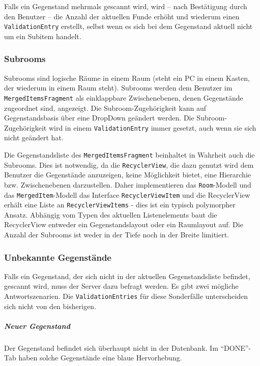 Falls ein Gegenstand mehrmals gescannt wird, wird -- nach Bestätigung
durch den Benutzer -- die Anzahl der aktuellen Funde erhöht und wiederum
einen \texttt{ValidationEntry} erstellt, selbst wenn es sich bei dem
Gegenstand aktuell nicht um ein Subitem handelt.

\hypertarget{subrooms}{%
\subsubsection{Subrooms}\label{subrooms}}

Subrooms sind logische Räume in einem Raum (\zB steht ein PC in einem
Kasten, der wiederum in einem Raum steht). Subrooms werden dem Benutzer
im \texttt{MergedItemsFragment} als einklappbare Zwischenebenen, denen
Gegenstände zugeordnet sind, angezeigt. Die Subroom-Zugehörigkeit kann
auf Gegenstandsbasis über eine DropDown geändert werden. Die
Subroom-Zugehörigkeit wird in einem \texttt{ValidationEntry} immer
gesetzt, auch wenn sie sich nicht geändert hat.

Die Gegenstandsliste des \texttt{MergedItemsFragment} beinhaltet in
Wahrheit auch die Subrooms. Dies ist notwendig, da die
\texttt{RecyclerView}, die dazu genutzt wird dem Benutzer die
Gegenstände anzuzeigen, keine Möglichkeit bietet, eine Hierarchie bzw.
Zwischenebenen darzustellen. Daher implementieren das
\texttt{Room}-Modell und das \texttt{MergedItem}-Modell das Interface
\texttt{RecyclerViewItem} und die RecyclerView erhält eine Liste an
\texttt{RecyclerViewItems} - dies ist ein typisch polymorpher Ansatz.
Abhängig vom Typen des aktuellen Listenelements baut die RecyclerView
entweder ein Gegenstandslayout oder ein Raumlayout auf. Die Anzahl der
Subrooms ist weder in der Tiefe noch in der Breite limitiert.

\hypertarget{unbekannte-gegenstuxe4nde}{%
\subsubsection{Unbekannte Gegenstände}\label{unbekannte-gegenstuxe4nde}}

Falls ein Gegenstand, der sich nicht in der aktuellen Gegenstandsliste
befindet, gescannt wird, muss der Server dazu befragt werden. Es gibt
zwei mögliche Antwortszenarien. Die \texttt{ValidationEntries} für diese
Sonderfälle unterscheiden sich nicht von den bisherigen.

\hypertarget{neuer-gegenstand}{%
\subparagraph{Neuer Gegenstand}\label{neuer-gegenstand}}

Der Gegenstand befindet sich überhaupt nicht in der Datenbank. Im
``DONE''-Tab haben solche Gegenstände eine blaue Hervorhebung.

